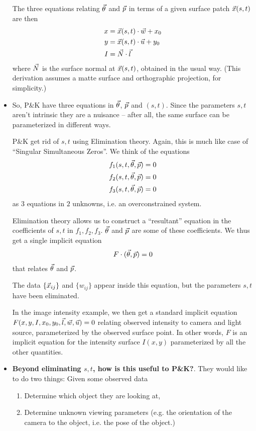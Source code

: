 \begin{example}
\begin{itemize}
  The three equations relating $\vec{\theta}$ and $\vec{p}$ in terms of a
  given surface patch $\vec{x}(s, t)$ are then
  \begin{align*}
    x &= \vec{x}(s, t)\cdot\vec{w} + x_0 \\
    y &= \vec{x}(s, t)\cdot\vec{u} + y_0 \\
    I &= \vec{N} \cdot \vec{l}
  \end{align*}
  where $\vec{N}$ is the surface normal at $\vec{x}(s, t)$, obtained in
  the usual way. (This derivation assumes a matte surface and
  orthographic projection, for simplicity.)
\item So, P\&K have three equations in $\vec{\theta}$, $\vec{p}$ and $(s,
  t)$. Since the parameters $s, t$ aren't intrinsic they are a
  nuisance -- after all, the same surface can be parameterized in
  different ways.

  P\&K get rid of $s, t$ using Elimination theory. Again, this is much
  like case of ``Singular Simultaneous Zeros''. We think of the
  equations
  \begin{align*}
    f_1(s, t, \vec{\theta}, \vec{p}) &= 0 \\
    f_2(s, t, \vec{\theta}, \vec{p}) &= 0 \\
    f_3(s, t, \vec{\theta}, \vec{p}) &= 0
  \end{align*}
  as $3$ equations in $2$ unknowns, i.e. an overconstrained system.

  Elimination theory allows us to construct a ``resultant'' equation
  in the coefficients of $s, t$ in $f_1, f_2, f_3$. $\vec{\theta}$ and
  $\vec{p}$ are some of these coefficients. We thus get a single
  implicit equation
  \begin{align*}
    F \cdot (\vec{\theta}, \vec{p}) = 0
  \end{align*}
  that relates $\vec{\theta}$ and $\vec{p}$.

  The data $\{\vec{x}_{ij}\}$ and $\{w_{ij}\}$ appear inside this
  equation, but the parameters $s, t$ have been eliminated.

  In the image intensity example, we then get a standard implicit
  equation $F(x, y, I, x_0, y_0, \vec{l}, \vec{w}, \vec{u}) = 0$ relating
  observed intensity to camera and light source, parameterized by the
  observed surface point. In other words, $F$ is an implicit equation
  for the intensity surface $I(x, y)$ parameterized by all the other
  quantities.
\item \textbf{Beyond eliminating $s, t$, how is this useful to
    P\&K?}. They would like to do two things: Given some observed data
  \begin{enumerate}
  \item Determine which object they are looking at,
  \item Determine unknown viewing parameters (e.g. the orientation of
    the camera to the object, i.e. the pose of the object.)
  \end{enumerate}


\end{itemize}
\end{example}

